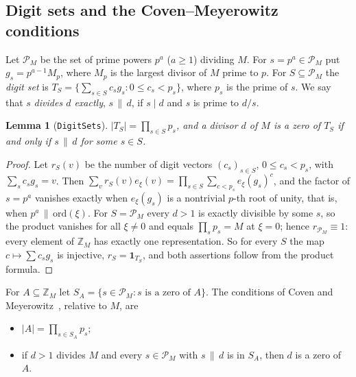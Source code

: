 \documentclass[11pt,a4paper]{amsart}
\newtheorem{lemma}[theorem]{Lemma}
\theoremstyle{definition}
\theoremstyle{remark}
\newcommand{\Z}{\mathbb{Z}}
\newcommand{\one}{\mathbf{1}}
\newcommand{\lean}[1]{\texttt{#1}}
\begin{document}
\subsection*{Digit sets and the Coven--Meyerowitz conditions}
Let $\mathcal P_M$ be the set of prime powers $p^a$ ($a\ge1$) dividing $M$. For $s=p^a\in\mathcal P_M$ put
$g_s=p^{a-1}M_p$, where $M_p$ is the largest divisor of $M$ prime to $p$. For $S\subseteq\mathcal P_M$ the
\emph{digit set} is $T_S=\{\sum_{s\in S}c_sg_s : 0\le c_s<p_s\}$, where $p_s$ is the prime of $s$. We say that
$s$ \emph{divides $d$ exactly}, $s\,\|\,d$, if $s\mid d$ and $s$ is prime to $d/s$.

\begin{lemma}[\lean{DigitSets}]\label{N:lem:digit}
$|T_S|=\prod_{s\in S}p_s$, and a divisor $d$ of $M$ is a zero of $T_S$ if and only if $s\,\|\,d$ for some $s\in S$.
\end{lemma}
\begin{proof}
Let $r_S(v)$ be the number of digit vectors $(c_s)_{s\in S}$, $0\le c_s<p_s$, with $\sum_sc_sg_s=v$. Then
$\sum_vr_S(v)e_\xi(v)=\prod_{s\in S}\sum_{c<p_s}e_\xi(g_s)^{c}$, and the factor of $s=p^a$ vanishes exactly when
$e_\xi(g_s)$ is a nontrivial $p$-th root of unity, that is, when $p^a\,\|\,\mathrm{ord}(\xi)$. For
$S=\mathcal P_M$ every $d>1$ is exactly divisible by some $s$, so the product vanishes for all $\xi\ne 0$ and
equals $\prod_sp_s=M$ at $\xi=0$; hence $r_{\mathcal P_M}\equiv 1$: every element of $\Z_M$ has exactly one
representation. So for every $S$ the map $c\mapsto\sum c_sg_s$ is injective, $r_S=\one_{T_S}$, and both
assertions follow from the product formula.
\end{proof}

For $A\subseteq\Z_M$ let $S_A=\{s\in\mathcal P_M: s\text{ is a zero of }A\}$. The conditions of Coven and
Meyerowitz~\cite{CM}, relative to $M$, are
\begin{itemize}
\item[\textup{(T1)}] $|A|=\prod_{s\in S_A}p_s$;
\item[\textup{(T2)}] if $d>1$ divides $M$ and every $s\in\mathcal P_M$ with $s\,\|\,d$ is in $S_A$, then $d$ is a zero of $A$.
\end{itemize}
\end{document}
